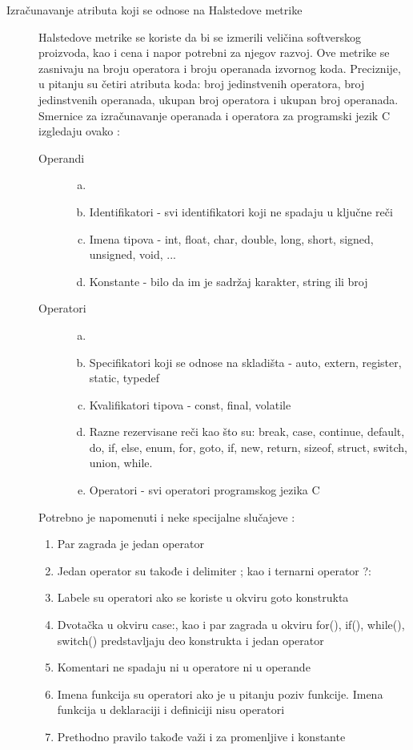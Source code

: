\documentclass[12pt,oneside]{memoir}
\begin{document}
\begin{description}
\item[Izračunavanje atributa koji se odnose na Halstedove metrike]

Halstedove metrike se koriste da bi se izmerili veličina softverskog proizvoda, kao i cena i napor potrebni za njegov razvoj. Ove metrike se zasnivaju na broju operatora i broju operanada izvornog koda. Preciznije, u pitanju su četiri atributa koda: broj jedinstvenih operatora, broj jedinstvenih operanada, ukupan broj operatora i ukupan broj operanada. Smernice za izračunavanje operanada i operatora za programski jezik C izgledaju ovako \cite{halstead}:
\begin{description}
\item[Operandi]
	\begin{enumerate}[(a)]
		\item[]
		\item Identifikatori - svi identifikatori koji ne spadaju u ključne reči
		\item Imena tipova - int, float, char, double, long, short, signed, unsigned, void, ... 
		\item Konstante - bilo da im je sadržaj karakter, string ili broj
	\end{enumerate}

\item[Operatori]
	\begin{enumerate}[(a)]
		\item[]
		\item Specifikatori koji se odnose na skladišta - auto, extern, register, static, typedef
		\item Kvalifikatori tipova - const, final, volatile
		\item Razne rezervisane reči kao što su: break, case, continue, default, do, if, else, enum, for, goto, if, new, return, sizeof, struct, switch, union, while. 
		\item Operatori - svi operatori programskog jezika C
	\end{enumerate}
\end{description}
Potrebno je napomenuti i neke specijalne slučajeve \cite{halstead}: 
\begin{enumerate}
	\item Par zagrada je jedan operator
	\item Jedan operator su takođe i delimiter ; kao i ternarni operator ?:
	\item Labele su operatori ako se koriste u okviru goto konstrukta
	\item Dvotačka u okviru case:, kao i par zagrada u okviru for(), if(), while(), switch() predstavljaju deo konstrukta i jedan operator 
	\item Komentari ne spadaju ni u operatore ni u operande
	\item Imena funkcija su operatori ako je u pitanju poziv funkcije. Imena funkcija u deklaraciji i definiciji nisu operatori
	\item Prethodno pravilo takođe važi i za promenljive i konstante
\end{enumerate}


\end{description}
\end{document}
